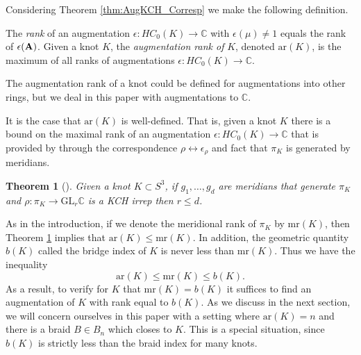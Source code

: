 \documentclass[11pt]{amsart}
\def\C{{\mathbb C}}
\newtheorem{thm}{Theorem}[section]
\newenvironment{definition}[1][Definition]{\begin{trivlist}
\item[\hskip \labelsep {\bfseries #1}]}{\end{trivlist}}
\newenvironment{rem}[1][Remark]{\begin{trivlist}
\item[\hskip \labelsep {\bfseries #1}]}{\end{trivlist}}
\begin{document}
  Considering Theorem \ref{thm:AugKCH_Corresp} we make the following definition.

  \begin{definition}
  The \emph{rank} of an augmentation $\epsilon:HC_0(K)\to\C$ with $\epsilon(\mu)\ne 1$ equals the rank of $\epsilon({\bf A})$. Given a knot $K$, the \emph{augmentation rank of } $K$, denoted $\text{ar}(K)$, is the maximum of all ranks of augmentations $\epsilon:HC_0(K)\to\C$.
  \label{defn:AugRk}
  \end{definition}

  \begin{rem} The augmentation rank of a knot could be defined for augmentations into other rings, but we deal in this paper with augmentations to $\C$.
  \end{rem}

  It is the case that $\text{ar}(K)$ is well-defined. That is, given a knot $K$ there is a bound on the maximal rank of an augmentation $\epsilon:HC_0(K)\to\C$ that is provided by through the correspondence $\rho\leftrightarrow\epsilon_\rho$ and fact that $\pi_K$ is generated by meridians.

  \begin{thm}[\cite{Cor13a}] Given a knot $K\subset S^3$, if $g_1,\ldots,g_d$ are meridians that generate $\pi_K$ and $\rho:\pi_K\to\text{GL}_r\C$ is a KCH irrep then $r\le d$.
  \label{thm:DimBound}
  \end{thm}

  As in the introduction, if we denote the meridional rank of $\pi_K$ by $\text{mr}(K)$, then Theorem \ref{thm:DimBound} implies that $\text{ar}(K)\le\text{mr}(K)$. In addition, the geometric quantity $b(K)$ called the bridge index of $K$ is never less than $\text{mr}(K)$. Thus we have the inequality 
    \[\text{ar}(K)\le\text{mr}(K)\le b(K).\]
  As a result, to verify for $K$ that $\text{mr}(K)=b(K)$ it suffices to find an augmentation of $K$ with rank equal to $b(K)$. As we discuss in the next section, we will concern ourselves in this paper with a setting where $\text{ar}(K)=n$ and there is a braid $B\in B_n$ which closes to $K$. This is a special situation, since $b(K)$ is strictly less than the braid index for many knots.
\end{document}
